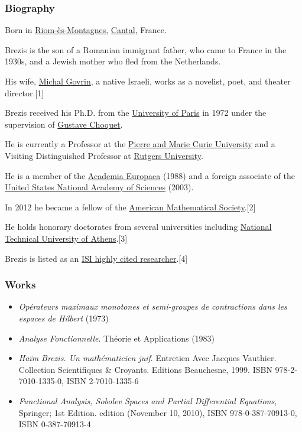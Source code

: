 \documentclass{article}
\begin{document}
\subsubsection{Biography}
Born in \href{https://en.wikipedia.org/wiki/Riom-%C3%A8s-Montagnes}{Riom-ès-Montagnes}, \href{https://en.wikipedia.org/wiki/Cantal}{Cantal}, France.

Brezis is the son of a Romanian immigrant father, who came to France in the 1930s, and a Jewish mother who fled from the Netherlands.

His wife, \href{https://en.wikipedia.org/wiki/Michal_Govrin}{Michal Govrin}, a native Israeli, works as a novelist, poet, and theater director.[1]

Brezis received his Ph.D. from the \href{https://en.wikipedia.org/wiki/University_of_Paris}{University of Paris} in 1972 under the supervision of \href{https://en.wikipedia.org/wiki/Gustave_Choquet}{Gustave Choquet}.

He is currently a Professor at the \href{https://en.wikipedia.org/wiki/Pierre_and_Marie_Curie_University}{Pierre and Marie Curie University} and a Visiting Distinguished Professor at \href{https://en.wikipedia.org/wiki/Rutgers_University}{Rutgers University}.

He is a member of the \href{https://en.wikipedia.org/wiki/Academia_Europaea}{Academia Europaea} (1988) and a foreign associate of the \href{https://en.wikipedia.org/wiki/United_States_National_Academy_of_Sciences}{United States National Academy of Sciences} (2003).

In 2012 he became a fellow of the \href{https://en.wikipedia.org/wiki/American_Mathematical_Society}{American Mathematical Society}.[2]

He holds honorary doctorates from several universities including \href{https://en.wikipedia.org/wiki/National_Technical_University_of_Athens}{National Technical University of Athens}.[3]

Brezis is listed as an \href{https://en.wikipedia.org/wiki/ISI_highly_cited_researcher}{ISI highly cited researcher}.[4]

\subsubsection{Works}
\begin{itemize}
	\item \textit{Opérateurs maximaux monotones et semi-groupes de contractions dans les espaces de Hilbert} (1973)
	\item \textit{Analyse Fonctionnelle}. Théorie et Applications (1983)
	\item \textit{Haïm Brezis. Un mathématicien juif}. Entretien Avec Jacques Vauthier. Collection Scientifiques \& Croyants. Editions Beauchesne, 1999. ISBN 978-2-7010-1335-0, ISBN 2-7010-1335-6
	\item \textit{Functional Analysis, Sobolev Spaces and Partial Differential Equations}, Springer; 1st Edition. edition (November 10, 2010), ISBN 978-0-387-70913-0, ISBN 0-387-70913-4
\end{itemize}
\end{document}
